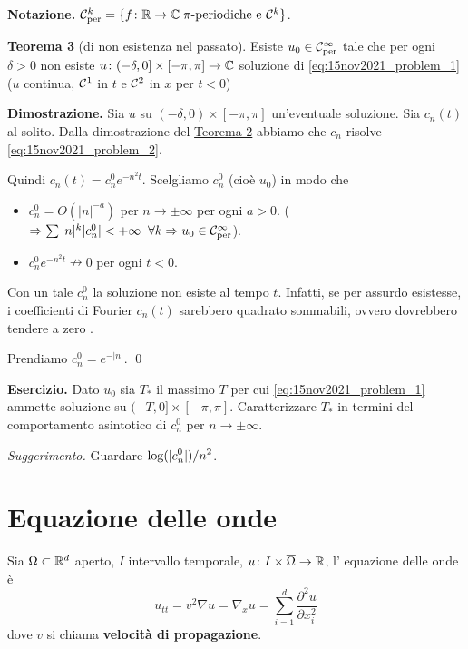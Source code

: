 %
%

\textbf{Notazione.} $\mathcal{C}_{\operatorname{per}}^k = \{ f\colon  \mathbb R \to \mathbb C \; \pi\text{-periodiche e } \mathcal{C}^k \} $.

\textbf{Teorema 3} (di non esistenza nel passato).
Esiste $u_0 \in \mathcal{C}_{\operatorname{per}}^\infty$ tale che per ogni $\delta > 0$ non esiste $u \colon (-\delta,0] \times [-\pi,\pi] \to \mathbb C$ soluzione di \eqref{eq:15nov2021_problem_1} ($u$ continua, $\mathcal{C}^1$ in $t$ e $\mathcal{C}^2$ in $x$ per $t < 0$)

\textbf{Dimostrazione.} Sia $u$ su $(-\delta,0) \times [-\pi,\pi]$ un'eventuale soluzione.
Sia $c_n(t)$ al solito.
Dalla dimostrazione del \hyperlink{thm:lez15nov_teo2}{Teorema 2} abbiamo che $c_n$ risolve \eqref{eq:15nov2021_problem_2}.

Quindi $c_n(t) = c_n^0 e^{-n^2 t}$. Scelgliamo $c_n^0$ (cioè $u_0$) in modo che

\begin{itemize}

	\item $c_n^0 = O(|n|^{-a})$ per $n \to \pm \infty$ per ogni $a > 0$. ($\Rightarrow \sum |n|^k |c_n^0| < +\infty \;\; \forall k \Rightarrow u_0 \in \mathcal{C}_{\operatorname{per}}^\infty$).


	\item $c_n^0 e^{-n^2 t} \nrightarrow 0$ per ogni $t < 0$.

\end{itemize}

Con un tale $c_n^0$ la soluzione non esiste al tempo $t$. Infatti, se per assurdo esistesse, i coefficienti di Fourier $c_n(t)$ sarebbero quadrato sommabili, ovvero dovrebbero tendere a zero \absurd.

Prendiamo $c_n^0 = e^{-|n|}$.
\qed

\textbf{Esercizio.} Dato $u_0$ sia $T_\ast $ il massimo $T$ per cui \eqref{eq:15nov2021_problem_1} ammette soluzione su $(-T,0] \times [-\pi,\pi]$.
Caratterizzare $T_\ast$ in termini del comportamento asintotico di $c_n^0$ per $n \to \pm \infty$.

\textit{Suggerimento.} Guardare $\displaystyle \log(|c_n^0|) / n^2$.


\section{Equazione delle onde}

Sia $\Omega \subset \mathbb R^d$ aperto, $I$ intervallo temporale, $u \colon I \times \overline{\Omega} \to \mathbb R$, l' equazione delle onde è
%
$$
	u_{tt} = v^2 \nabla u = \nabla_x u = \sum_{i=1}^{d} \frac{\partial^2 u}{\partial x_i^2}
$$
%
dove $v$ si chiama \textbf{velocità di propagazione}.

